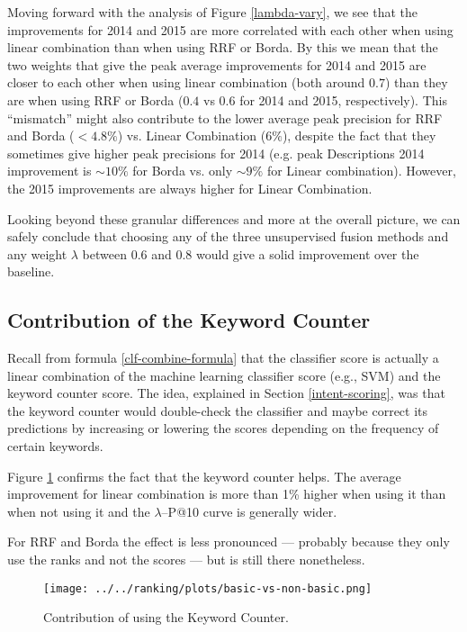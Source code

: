 Moving forward with the analysis of Figure \ref{lambda-vary}, we see that
the improvements for 2014 and 2015 are more correlated with each other when using linear combination than when using
RRF or Borda. By this we mean that the two weights that give the peak average improvements for 2014 and 2015 are closer to each other
when using linear combination (both around $0.7$) than they are when using RRF or Borda ($0.4$ vs $0.6$ for 2014 and 2015, respectively).
This ``mismatch'' might also contribute to the lower average peak precision for RRF and Borda ($<4.8\%$) 
vs. Linear Combination ($6\%$), despite the fact that they sometimes 
give higher peak precisions for 2014 (e.g. peak Descriptions 2014 improvement 
is $\sim10\%$ for Borda vs. only $\sim9\%$ for Linear combination). However, the 2015 improvements are always higher for
Linear Combination.

Looking beyond these granular differences and more at the overall picture, we can safely conclude
that choosing any of the three unsupervised fusion methods and any weight $\lambda$ between 0.6 and 0.8 would give
a solid improvement over the baseline.

\subsection{Contribution of the Keyword Counter}
Recall from formula \ref{clf-combine-formula} that the classifier score is actually 
a linear combination of the machine learning classifier score (e.g., SVM) and the keyword counter score. The idea, 
explained in Section \ref{intent-scoring}, 
was that the keyword counter would double-check the classifier and maybe correct its predictions by
increasing or lowering the scores depending on the frequency of certain keywords.

Figure \ref{basic-effect-plot}
confirms the fact that the keyword counter helps. The average improvement for linear combination is more than 1\% higher
when using it than when not using it and the $\lambda$--P@10 curve is generally wider.

For RRF and Borda the effect is less pronounced --- probably because they only use the ranks and not the scores ---
but is still there nonetheless.

\begin{figure}[h!]
\centerline{
  \texttt{[image: ../../ranking/plots/basic-vs-non-basic.png]}
  }
  \caption{Contribution of using the Keyword Counter.}
  \label{basic-effect-plot}
\end{figure}

